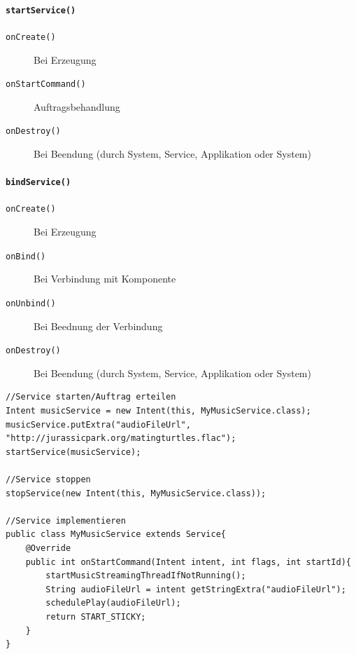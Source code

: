\documentclass[a4paper, 11pt]{article}
\newcommand{\code}[1]{\texttt{#1}}
\begin{document}
\begin{multicols}{2}
	\paragraph{\code{startService()}}
	\begin{description}
		\item[\code{onCreate()}] Bei Erzeugung
		\item[\code{onStartCommand()}] Auftragsbehandlung
		\item[\code{onDestroy()}] Bei Beendung (durch System, Service, Applikation oder System)
	\end{description}
\columnbreak
	\paragraph{\code{bindService()}}
	\begin{description}
		\item[\code{onCreate()}] Bei Erzeugung
		\item[\code{onBind()}] Bei Verbindung mit Komponente
		\item[\code{onUnbind()}] Bei Beednung der Verbindung
		\item[\code{onDestroy()}] Bei Beendung (durch System, Service, Applikation oder System)
	\end{description}
\end{multicols}

\begin{lstlisting}[caption={Implementierung und Starten eines Services}]
//Service starten/Auftrag erteilen
Intent musicService = new Intent(this, MyMusicService.class);
musicService.putExtra("audioFileUrl", "http://jurassicpark.org/matingturtles.flac");
startService(musicService);

//Service stoppen
stopService(new Intent(this, MyMusicService.class));

//Service implementieren
public class MyMusicService extends Service{
	@Override
	public int onStartCommand(Intent intent, int flags, int startId){
		startMusicStreamingThreadIfNotRunning();
		String audioFileUrl = intent getStringExtra("audioFileUrl");
		schedulePlay(audioFileUrl);
		return START_STICKY;
	}
}
\end{lstlisting}
\end{document}
